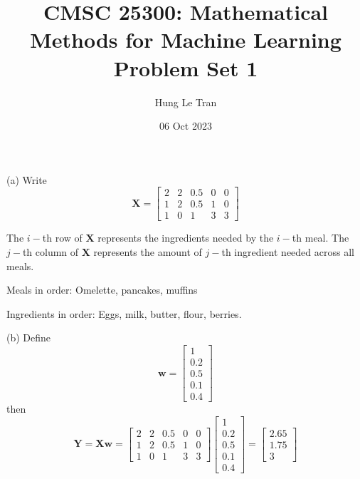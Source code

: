 \documentclass[a4paper, 12pt]{article}
\title{CMSC 25300: Mathematical Methods for Machine Learning \\ \large Problem Set 1}
\date{06 Oct 2023}
\author{Hung Le Tran}
\begin{document}
\maketitle
\setcounter{section}{1}
\setcounter{problem}{1}
\begin{problem} 
\end{problem}
\begin{solution}
    (a) Write \[
        \mathbf{X} = \begin{bmatrix}
            2 & 2 & 0.5 & 0 & 0 \\
            1 & 2 & 0.5 & 1 & 0 \\
            1 & 0 & 1   & 3 & 3
        \end{bmatrix}
    \]

    The $i-$th row of $\mathbf{X}$ represents the ingredients needed by the $i-$th meal. The $j-$th column of $\mathbf{X}$ represents the amount of $j-$th ingredient needed across all meals.

    Meals in order: Omelette, pancakes, muffins


    Ingredients in order: Eggs, milk, butter, flour, berries.

    (b) Define \[
        \mathbf{w} = \begin{bmatrix}
            1   \\
            0.2 \\
            0.5 \\
            0.1 \\
            0.4
        \end{bmatrix}
    \]
    then \[
        \mathbf{Y} = \mathbf{Xw} = \begin{bmatrix}
            2 & 2 & 0.5 & 0 & 0 \\
            1 & 2 & 0.5 & 1 & 0 \\
            1 & 0 & 1   & 3 & 3
        \end{bmatrix}\begin{bmatrix}
            1   \\
            0.2 \\
            0.5 \\
            0.1 \\
            0.4
        \end{bmatrix} = \begin{bmatrix}
            2.65\\
            1.75\\
            3
        \end{bmatrix}
    \]


\end{solution}
\end{document}

